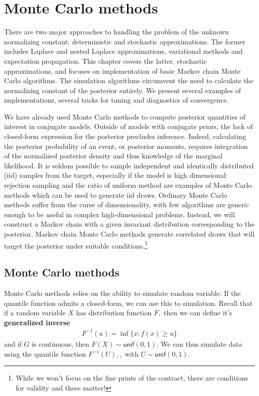 \documentclass[
  11pt,
  letterpaper,
]{scrbook}
\theoremstyle{definition}
\theoremstyle{plain}
\theoremstyle{plain}
\theoremstyle{definition}
\theoremstyle{definition}
\theoremstyle{remark}
\begin{document}

\chapter{Monte Carlo methods}\label{monte-carlo-methods}

There are two major approaches to handling the problem of the unknown
normalizing constant: deterministic and stochastic approximations. The
former includes Laplace and nested Laplace approximations, variational
methods and expectation propagation. This chapter covers the latter,
stochastic approximations, and focuses on implementation of basic Markov
chain Monte Carlo algorithms. The simulation algorithms circumvent the
need to calculate the normalizing constant of the posterior entirely. We
present several examples of implementations, several tricks for tuning
and diagnostics of convergence.

We have already used Monte Carlo methods to compute posterior quantities
of interest in conjugate models. Outside of models with conjugate
priors, the lack of closed-form expression for the posterior precludes
inference. Indeed, calculating the posterior probability of an event, or
posterior moments, requires integration of the normalized posterior
density and thus knowledge of the marginal likelihood. It is seldom
possible to sample independent and identically distributed (iid) samples
from the target, especially if the model is high dimensional: rejection
sampling and the ratio of uniform method are examples of Monte Carlo
methods which can be used to generate iid draws. Ordinary Monte Carlo
methods suffer from the curse of dimensionality, with few algorithms are
generic enough to be useful in complex high-dimensional problems.
Instead, we will construct a Markov chain with a given invariant
distribution corresponding to the posterior. Markov chain Monte Carlo
methods generate correlated draws that will target the posterior under
suitable conditions.\footnote{While we won't focus on the fine prints of
  the contract, there are conditions for validity and these matter!}

\section{Monte Carlo methods}\label{monte-carlo-methods-1}

Monte Carlo methods relies on the ability to simulate random variable.
If the quantile function admits a closed-form, we can use this to
simulation. Recall that if a random variable \(X\) has distribution
function \(F,\) then we can define it's \textbf{generalized inverse}
\begin{align*}
F^{-1}(u) = \inf\{x: f(x) \geq u\}
\end{align*} and if \(G\) is continuous, then
\(F(X) \sim \mathsf{unif}(0,1).\) We can thus simulate data using the
quantile function \(F^{-1}(U),,\) with \(U \sim \mathsf{unif}(0,1).\)
\end{document}
